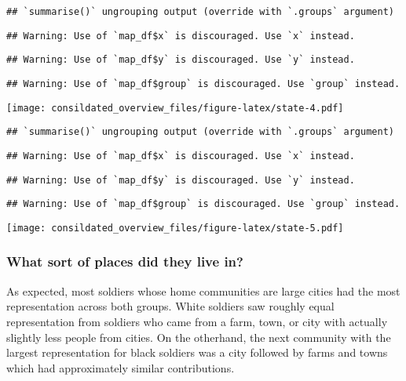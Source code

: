 \documentclass[]{article}
\begin{document}
\begin{verbatim}
## `summarise()` ungrouping output (override with `.groups` argument)
\end{verbatim}

\begin{verbatim}
## Warning: Use of `map_df$x` is discouraged. Use `x` instead.
\end{verbatim}

\begin{verbatim}
## Warning: Use of `map_df$y` is discouraged. Use `y` instead.
\end{verbatim}

\begin{verbatim}
## Warning: Use of `map_df$group` is discouraged. Use `group` instead.
\end{verbatim}

\texttt{[image: consildated\_overview\_files/figure-latex/state-4.pdf]}

\begin{verbatim}
## `summarise()` ungrouping output (override with `.groups` argument)
\end{verbatim}

\begin{verbatim}
## Warning: Use of `map_df$x` is discouraged. Use `x` instead.
\end{verbatim}

\begin{verbatim}
## Warning: Use of `map_df$y` is discouraged. Use `y` instead.
\end{verbatim}

\begin{verbatim}
## Warning: Use of `map_df$group` is discouraged. Use `group` instead.
\end{verbatim}

\texttt{[image: consildated\_overview\_files/figure-latex/state-5.pdf]}

\subsubsection{What sort of places did they live
in?}\label{what-sort-of-places-did-they-live-in}

As expected, most soldiers whose home communities are large cities had
the most representation across both groups. White soldiers saw roughly
equal representation from soldiers who came from a farm, town, or city
with actually slightly less people from cities. On the otherhand, the
next community with the largest representation for black soldiers was a
city followed by farms and towns which had approximately similar
contributions.
\end{document}
